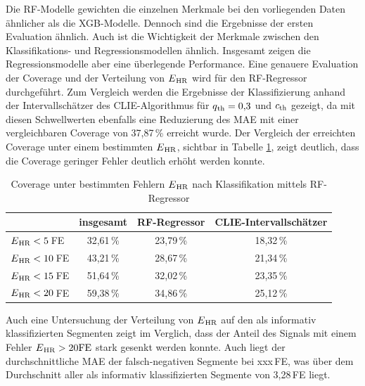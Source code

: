  Die \ac{RF}-Modelle gewichten die einzelnen Merkmale bei den vorliegenden Daten ähnlicher als die \ac{XGB}-Modelle. Dennoch sind die Ergebnisse der ersten Evaluation ähnlich. Auch ist die Wichtigkeit der Merkmale zwischen den Klassifikations- und Regressionsmodellen ähnlich. Insgesamt zeigen die Regressionsmodelle aber eine überlegende Performance. Eine genauere Evaluation der Coverage und der Verteilung von $E\textsubscript{HR}$ wird für den \ac{RF}-Regressor durchgeführt. Zum Vergleich werden die Ergebnisse der Klassifizierung anhand der Intervallschätzer des \ac{CLIE}-Algorithmus für $q\textsubscript{th}=0{,}3$ und $c\textsubscript{th}$ gezeigt, da mit diesen Schwellwerten ebenfalls eine Reduzierung des \ac{MAE} mit einer vergleichbaren Coverage von 37,87\,\% erreicht wurde. Der Vergleich der erreichten Coverage unter einem bestimmten $E\textsubscript{HR}$, sichtbar in Tabelle \ref{fig:own-coverage-default}, zeigt deutlich, dass die Coverage geringer Fehler deutlich erhöht werden konnte. 
 
  \begin{table}[h]
 	\centering
  	\begin{tabular}{l || c | c | c}
 											& insgesamt 		& \ac{RF}-Regressor & \ac{CLIE}-Intervallschätzer\\\hline
 		$E\textsubscript{HR} < 5$\,\si{FE} 	&  32{,}61\,\% 	& 23,79\,\% 			& 18,32\,\%\\
 		$E\textsubscript{HR} < 10$\,\si{FE} 	&  43{,}21\,\% 	& 28,67\,\% 			& 21,34\,\%\\
 		$E\textsubscript{HR} < 15$\,\si{FE} 	&  51{,}64\,\% 	& 32,02\,\% 			& 23,35\,\%\\
 		$E\textsubscript{HR} < 20$\,\si{FE} 	&  59{,}38\,\% 	& 34,86\,\% 			& 25,12\,\%\\
 	\end{tabular}
 	\caption[Coverage unter bestimmten Fehlern $E\textsubscript{HR}$ nach Klassifikation mittels \ac{RF}-Regressor]{Coverage unter bestimmten Fehlern $E\textsubscript{HR}$ nach Klassifikation mittels \ac{RF}-Regressor}
 	\label{fig:own-coverage-default}
 \end{table}
 
 Auch eine Untersuchung der Verteilung von $E\textsubscript{HR}$ auf den als informativ klassifizierten Segmenten zeigt im Verglich, dass der Anteil des Signals mit einem Fehler $E\textsubscript{HR} > 20\si{FE}$ stark gesenkt werden konnte. Auch liegt der durchschnittliche \ac{MAE} der falsch-negativen Segmente bei xxx\,\si{FE}, was über dem Durchschnitt aller als informativ klassifizierten Segmente von 3,28\,\si{FE} liegt.
 
